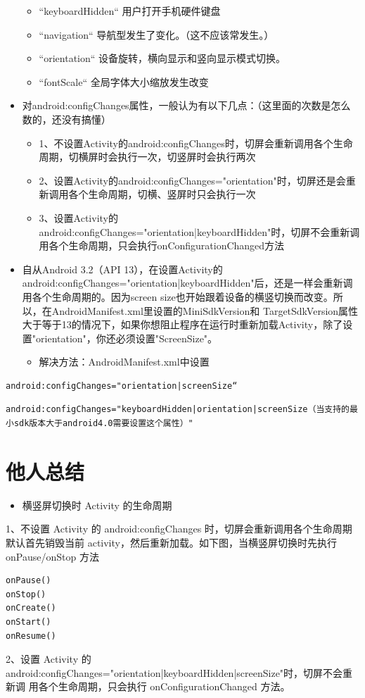 \documentclass[9pt, b5paaper]{book}
\begin{document}
\begin{itemize}
\begin{itemize}
\item “keyboardHidden“ 用户打开手机硬件键盘
\item “navigation“ 导航型发生了变化。（这不应该常发生。）
\item “orientation“ 设备旋转，横向显示和竖向显示模式切换。
\item “fontScale“ 全局字体大小缩放发生改变
\end{itemize}
\item 对android:configChanges属性，一般认为有以下几点：（这里面的次数是怎么数的，还没有搞懂）
\begin{itemize}
\item 1、不设置Activity的android:configChanges时，切屏会重新调用各个生命周期，切横屏时会执行一次，切竖屏时会执行两次
\item 2、设置Activity的android:configChanges="orientation"时，切屏还是会重新调用各个生命周期，切横、竖屏时只会执行一次
\item 3、设置Activity的android:configChanges="orientation|keyboardHidden"时，切屏不会重新调用各个生命周期，只会执行onConfigurationChanged方法
\end{itemize}
\item 自从Android 3.2（API 13），在设置Activity的android:configChanges="orientation|keyboardHidden"后，还是一样会重新调用各个生命周期的。因为screen size也开始跟着设备的横竖切换而改变。所以，在AndroidManifest.xml里设置的MiniSdkVersion和 TargetSdkVersion属性大于等于13的情况下，如果你想阻止程序在运行时重新加载Activity，除了设置"orientation"，你还必须设置"ScreenSize"。
\begin{itemize}
\item 解决方法：AndroidManifest.xml中设置
\end{itemize}
\end{itemize}
\begin{verbatim}
android:configChanges="orientation|screenSize“
\end{verbatim}

\begin{verbatim}
android:configChanges="keyboardHidden|orientation|screenSize（当支持的最小sdk版本大于android4.0需要设置这个属性）"
\end{verbatim}

\section{他人总结}
\label{sec-1-5}
\begin{itemize}
\item 横竖屏切换时 Activity 的生命周期
\end{itemize}
1、不设置 Activity 的 android:configChanges 时，切屏会重新调用各个生命周期 默认首先销毁当前 activity，然后重新加载。如下图，当横竖屏切换时先执行 onPause/onStop 方法
\begin{verbatim}
onPause()
onStop()
onCreate()
onStart()
onResume()
\end{verbatim}
2、设置 Activity 的 android:configChanges="orientation|keyboardHidden|screenSize"时，切屏不会重新调 用各个生命周期，只会执行 onConfigurationChanged 方法。
\end{document}
